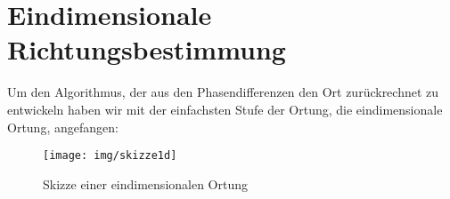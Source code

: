 \section{Eindimensionale Richtungsbestimmung} 
  Um den Algorithmus, der aus den Phasendifferenzen den Ort zurückrechnet zu entwickeln haben wir mit der
einfachsten Stufe der Ortung, die eindimensionale Ortung, angefangen:
    \begin{figure}
        \centering
        \texttt{[image: img/skizze1d]}
        \caption{Skizze einer eindimensionalen Ortung}
    \end{figure}
